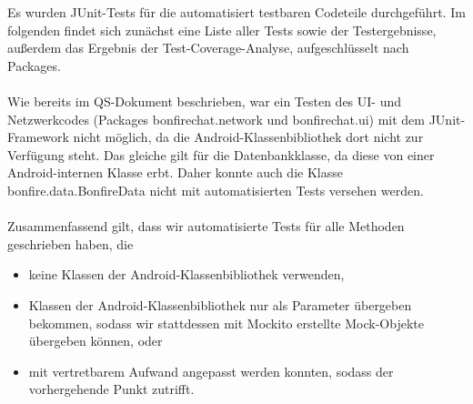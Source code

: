 Es wurden JUnit-Tests für die automatisiert testbaren Codeteile durchgeführt.
Im folgenden findet sich zunächst eine Liste aller Tests sowie der Testergebnisse,
außerdem das Ergebnis der Test-Coverage-Analyse, aufgeschlüsselt nach Packages.
\\\\
Wie bereits im QS-Dokument beschrieben, war ein Testen des UI- und Netzwerkcodes
(Packages bonfirechat.network und bonfirechat.ui)
mit dem JUnit-Framework nicht möglich, da die Android-Klassenbibliothek dort nicht
zur Verfügung steht. Das gleiche gilt für die Datenbankklasse, da diese von einer
Android-internen Klasse erbt. Daher konnte auch die Klasse bonfire.data.BonfireData
nicht mit automatisierten Tests versehen werden.
\\\\
Zusammenfassend gilt, dass wir automatisierte Tests für alle Methoden geschrieben haben,
die
\begin{itemize}
\item keine Klassen der Android-Klassenbibliothek verwenden,
\item Klassen der Android-Klassenbibliothek nur als Parameter übergeben bekommen,
sodass wir stattdessen mit Mockito erstellte Mock-Objekte übergeben können, oder
\item mit vertretbarem Aufwand angepasst werden konnten, sodass der vorhergehende Punkt zutrifft.
\end{itemize}












\clearpage

